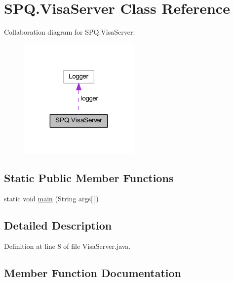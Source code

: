 \hypertarget{class_s_p_q_1_1_visa_server}{}\section{S\+P\+Q.\+Visa\+Server Class Reference}
\label{class_s_p_q_1_1_visa_server}


Collaboration diagram for S\+P\+Q.\+Visa\+Server\+:
\nopagebreak
\begin{figure}[H]
\begin{center}
\leavevmode
\includegraphics[width=167pt]{class_s_p_q_1_1_visa_server__coll__graph}
\end{center}
\end{figure}
\subsection*{Static Public Member Functions}
\begin{DoxyCompactItemize}
\item 
static void \mbox{\hyperlink{class_s_p_q_1_1_visa_server_adb71a2f4fb93f80faae22d928a2a5229}{main}} (String args\mbox{[}$\,$\mbox{]})
\end{DoxyCompactItemize}


\subsection{Detailed Description}


Definition at line 8 of file Visa\+Server.\+java.



\subsection{Member Function Documentation}
\mbox{\label{class_s_p_q_1_1_visa_server_adb71a2f4fb93f80faae22d928a2a5229}} 
